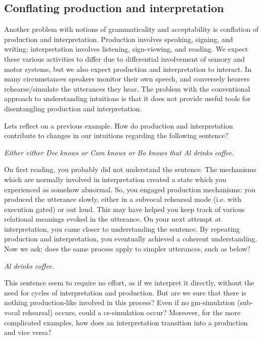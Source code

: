 \subsection{Conflating production and interpretation}

Another problem with notions of grammaticality and acceptability is conflation of production and interpretation. Production involves speaking, signing, and writing; interpretation involves listening, sign-viewing, and reading. We expect these various activities to differ due to differential involvement of sensory and motor systems, but we also expect production and interpretation to interact. In many circumstances speakers monitor their own speech, and conversely hearers rehearse/simulate the utterances they hear. The problem with the conventional approach to understanding intuitions is that it does not provide useful tools for disentangling production and interpretation.

  Lets reflect on a previous example. How do production and interpretation contribute to changes in our intuitions regarding the following sentence? 

    \textit{Either either Dee knows or Cam knows or Bo knows that Al drinks coffee.}

  On first reading, you probably did not understand the sentence. The mechanisms which are normally involved in interpretation created a state which you experienced as somehow abnormal. So, you engaged production mechanisms: you produced the utterance slowly, either in a subvocal rehearsal mode (i.e. with execution gated) or out loud. This may have helped you keep track of various relational meanings evoked in the utterance. On your next attempt at interpretation, you came closer to understanding the sentence. By repeating production and interpretation, you eventually achieved a coherent understanding. Now we ask: does the same process apply to simpler utterances, such as below?

    \textit{Al drinks coffee.}

  This sentence seem to require no effort, as if we interpret it directly, without the need for cycles of interpretation and production. But are we sure that there is nothing production-like involved in this process? Even if no gm-simulation (sub-vocal rehearsal) occurs, could a cs-simulation occur? Moreover, for the more complicated examples, how does an interpretation transition into a production and vice versa?

